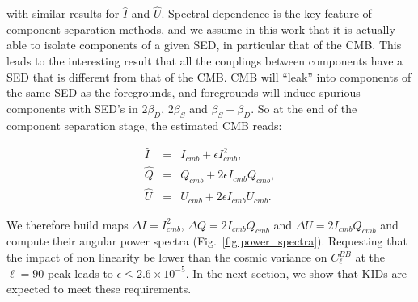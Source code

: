\noindent with similar results for $\hat{I}$ and $\hat{U}$. Spectral dependence is the key
feature of component separation methods, and we assume in this work that it is
actually able to isolate components of a given SED, in particular that of the
CMB. This leads to the interesting result that all the couplings between
components have a SED that is different from that of the CMB. CMB will ``leak''
into components of the same SED as the foregrounds, and foregrounds will induce
spurious components with SED's in $2\beta_D$, $2\beta_S$ and
$\beta_S+\beta_D$. So at the end of the component separation stage, the
estimated CMB reads:

\begin{eqnarray}
\hat{I} &=& I_{cmb} +  \epsilon I_{cmb}^2, \label{eq:spurious-mapI}\\
\hat{Q} &=& Q_{cmb} + 2\epsilon I_{cmb}Q_{cmb}, \label{eq:spurious-mapQ}\\
\hat{U} &=& U_{cmb} + 2\epsilon I_{cmb}U_{cmb} \label{eq:spurious-mapU}.
\end{eqnarray}

We therefore build maps $\Delta I = I_{cmb}^2$, $\Delta Q = 2I_{cmb}Q_{cmb}$ and
$\Delta U = 2I_{cmb}Q_{cmb}$ and compute their angular power spectra
(Fig.~\ref{fig:power_spectra}). Requesting that the impact of non linearity be
lower than the cosmic variance on $C^{BB}_\ell$ at the $\ell=90$ peak leads to
$\epsilon \leq 2.6\times 10^{-5}$. In the next section, we show that KIDs are expected
to meet these requirements.




